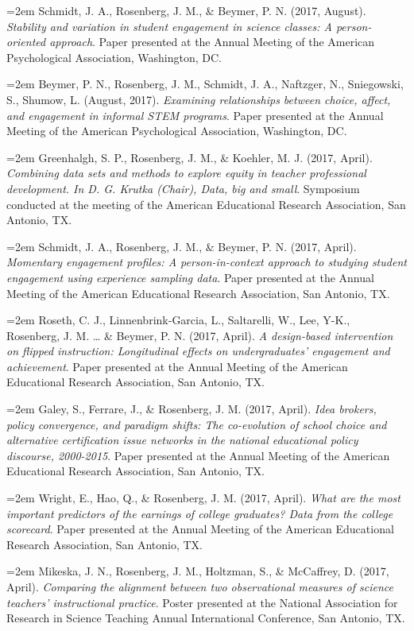 \documentclass[14,]{article}
\begin{document}
\hangindent=2em Schmidt, J. A., Rosenberg, J. M., \& Beymer, P. N.
(2017, August). \emph{Stability and variation in student engagement in
science classes: A person-oriented approach}. Paper presented at the
Annual Meeting of the American Psychological Association, Washington,
DC.

\hangindent=2em Beymer, P. N., Rosenberg, J. M., Schmidt, J. A.,
Naftzger, N., Sniegowski, S., Shumow, L. (August, 2017). \emph{Examining
relationships between choice, affect, and engagement in informal STEM
programs}. Paper presented at the Annual Meeting of the American
Psychological Association, Washington, DC.

\hangindent=2em Greenhalgh, S. P., Rosenberg, J. M., \& Koehler, M. J.
(2017, April). \emph{Combining data sets and methods to explore equity
in teacher professional development. In D. G. Krutka (Chair), Data, big
and small}. Symposium conducted at the meeting of the American
Educational Research Association, San Antonio, TX.

\hangindent=2em Schmidt, J. A., Rosenberg, J. M., \& Beymer, P. N.
(2017, April). \emph{Momentary engagement profiles: A person-in-context
approach to studying student engagement using experience sampling data}.
Paper presented at the Annual Meeting of the American Educational
Research Association, San Antonio, TX.

\hangindent=2em Roseth, C. J., Linnenbrink-Garcia, L., Saltarelli, W.,
Lee, Y-K., Rosenberg, J. M. \ldots{} \& Beymer, P. N. (2017, April).
\emph{A design-based intervention on flipped instruction: Longitudinal
effects on undergraduates' engagement and achievement}. Paper presented
at the Annual Meeting of the American Educational Research Association,
San Antonio, TX.

\hangindent=2em Galey, S., Ferrare, J., \& Rosenberg, J. M. (2017,
April). \emph{Idea brokers, policy convergence, and paradigm shifts: The
co-evolution of school choice and alternative certification issue
networks in the national educational policy discourse, 2000-2015}. Paper
presented at the Annual Meeting of the American Educational Research
Association, San Antonio, TX.

\hangindent=2em Wright, E., Hao, Q., \& Rosenberg, J. M. (2017, April).
\emph{What are the most important predictors of the earnings of college
graduates? Data from the college scorecard}. Paper presented at the
Annual Meeting of the American Educational Research Association, San
Antonio, TX.

\hangindent=2em Mikeska, J. N., Rosenberg, J. M., Holtzman, S., \&
McCaffrey, D. (2017, April). \emph{Comparing the alignment between two
observational measures of science teachers' instructional practice}.
Poster presented at the National Association for Research in Science
Teaching Annual International Conference, San Antonio, TX.
\end{document}
